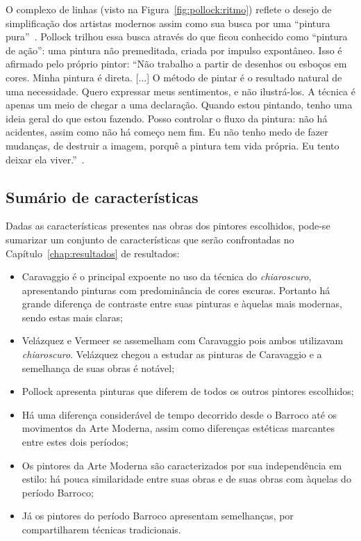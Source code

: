 O complexo de linhas (visto na Figura~\ref{fig:pollock:ritmo}) reflete o desejo
de simplificação dos artistas modernos assim como sua busca por uma ``pintura
pura''~\cite{gombrich}. Pollock trilhou essa busca através do que ficou
conhecido como ``pintura de ação'': uma pintura não premeditada, criada por
impulso expontâneo. Isso é afirmado pelo próprio pintor: ``Não trabalho a partir de desenhos ou esboços em cores. Minha pintura é direta. [...] O método de pintar é o resultado natural de uma necessidade. Quero expressar meus sentimentos, e não ilustrá-los. A técnica é apenas um meio de chegar a uma declaração. Quando estou pintando, tenho uma ideia geral do que estou fazendo. Posso controlar o fluxo da pintura: não há acidentes, assim como não há começo nem fim. Eu não tenho medo de fazer
mudanças, de destruir a imagem, porquê a pintura tem vida própria. Eu
tento deixar ela viver.''~\cite{pollock}.

\subsection{Sumário de características}
\label{subsec:sumario}

Dadas as características presentes nas obras dos pintores escolhidos,
pode-se sumarizar um conjunto de características que serão
confrontadas no Capítulo~\ref{chap:resultados} de resultados:

\begin{itemize}
\item Caravaggio é o principal expoente no uso da técnica do \textit{chiaroscuro}, apresentando pinturas com predominância de cores escuras. Portanto há grande diferença de contraste entre suas pinturas e àquelas mais modernas, sendo estas mais claras;

\item Velázquez e Vermeer se assemelham com Caravaggio pois ambos utilizavam \textit{chiaroscuro}. Velázquez chegou a estudar as pinturas de Caravaggio e a semelhança de suas obras é notável;

\item Pollock apresenta pinturas que diferem de todos os outros pintores escolhidos;

\item Há uma diferença considerável de tempo decorrido desde o Barroco até os movimentos da Arte Moderna, assim como diferenças estéticas marcantes entre estes dois períodos;

\item Os pintores da Arte Moderna são caracterizados por sua independência em estilo: há pouca similaridade entre suas obras e de suas obras com àquelas do período Barroco;

\item Já os pintores do período Barroco apresentam semelhanças, por compartilharem técnicas tradicionais.
\end{itemize}

